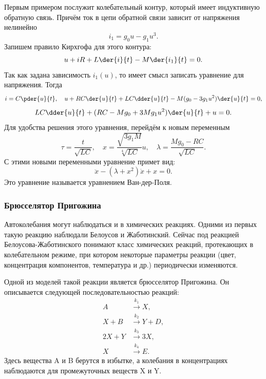 Первым примером послужит колебательный контур, который имеет индуктивную
обратную связь. Причём ток в цепи обратной связи зависит от напряжения нелинейно
\[
    i_1 = g_0u - g_1u^3.
\]
Запишем правило Кирхгофа для этого контура:
\[
    u + iR + L\der{i}{t} - M\der{i_1}{t} = 0.
\]
Так как задана зависимость \( i_1(u) \), то имеет смысл записать уравнение для
напряжения. Тогда
\[
    i = C\pder{u}{t},\quad
    u + RC\der{u}{t} + LC\dder{u}{t} - M(g_0 - 3g_1u^2)\der{u}{t} = 0,
\]
\[
    LC\dder{u}{t} + (RC - Mg_0 + 3Mg_1u^2)\der{u}{t} + u = 0.
\]
Для удобства решения этого уравнения, перейдём к новым переменным
\[
    \tau = \frac{t}{\sqrt{LC}},\quad
    x = \frac{\sqrt{3g_1M}}{\sqrt[4]{LC}}u,\quad
    \lambda = \frac{Mg_0 - RC}{\sqrt{LC}}.
\]
С этими новыми переменными уравнение примет вид:
\[
    \ddot{x} - (\lambda + x^2)\dot{x} + x = 0.
\]
Это уравнение называется уравнением Ван-дер-Поля.

\subsubsection{Брюсселятор Пригожина}
Автоколебания могут наблюдаться и в химических реакциях. Одними из первых такую
реакцию наблюдали Белоусов и Жаботинский. Сейчас под реакцией
Белоусова-Жаботинского понимают класс химических реакций, протекающих в
колебательном режиме, при котором некоторые параметры реакции (цвет,
концентрация компонентов, температура и др.) периодически изменяются.

Одной из моделей такой реакции является брюсселятор Пригожина. Он описывается
следующей последовательностью реакций:
\begin{align*}
    A      & \xrightarrow{k_1} X,\\
    X + B  & \xrightarrow{k_2} Y + D,\\
    2X + Y & \xrightarrow{k_3} 3X,\\
    X      & \xrightarrow{k_4} E.
\end{align*}
Здесь вещества A и B берутся в избытке, а колебания в концентрациях
наблюдаются для промежуточных веществ X и Y.

